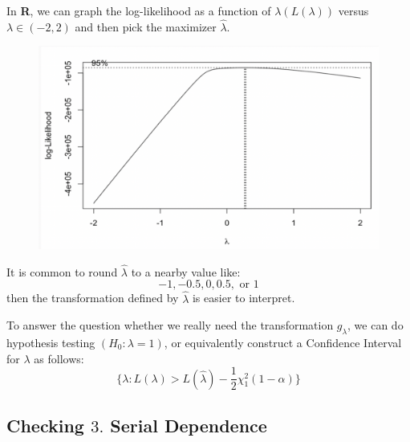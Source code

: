 \documentclass[11pt,a4paper]{article}
\begin{document}
In \textbf{R}, we can graph the log-likelihood as a function of $\lambda (L(\lambda))$ versus $\lambda\in (−2, 2)$ and then pick the maximizer $\hat{\lambda}$.\\
\begin{center}\begin{figure}[htbp]
    \centering
    \includegraphics[scale=0.5]{check8.png}
    \caption{}
    \label{}
\end{figure}\end{center}
It is common to round $\hat{\lambda}$ to a nearby value like:
$$−1, −0.5, 0, 0.5, \text{ or } 1 $$then the transformation deﬁned by $\hat{\lambda}$ is easier to interpret.

To answer the question whether we really need the transformation $g_\lambda$, we can do hypothesis testing $(H_0 : \lambda = 1)$, or equivalently construct a Conﬁdence Interval for $\lambda$ as follows:
$$\{\lambda: L(\lambda)>L(\hat{\lambda})-\frac{1}{2}\chi_1^2(1-\alpha)  \}$$

















\subsection{ Checking $3.$ Serial Dependence}
\end{document}
